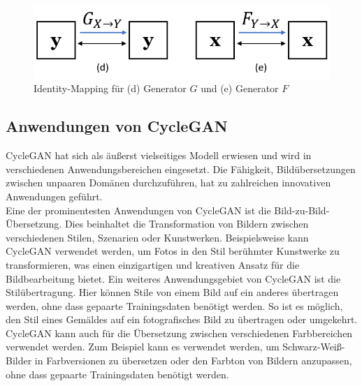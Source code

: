 \begin{figure}[h]
	\centering
	\includegraphics[width=0.7\linewidth]{./images/identity_loss.png}
	\caption{Identity-Mapping für (d) Generator $G$ und (e) Generator $F$}
	\label{fig:IdentityMapping}
\end{figure}


\subsection{Anwendungen von CycleGAN}
CycleGAN hat sich als äußerst vielseitiges Modell erwiesen und wird in verschiedenen Anwendungsbereichen eingesetzt. Die Fähigkeit, Bildübersetzungen zwischen unpaaren Domänen durchzuführen, hat zu zahlreichen innovativen Anwendungen geführt.
\\
Eine der prominentesten Anwendungen von CycleGAN ist die Bild-zu-Bild-Übersetzung. Dies beinhaltet die Transformation von Bildern zwischen verschiedenen Stilen, Szenarien oder Kunstwerken. Beispielsweise kann CycleGAN verwendet werden, um Fotos in den Stil berühmter Kunstwerke zu transformieren, was einen einzigartigen und kreativen Ansatz für die Bildbearbeitung bietet.
Ein weiteres Anwendungsgebiet von CycleGAN ist die Stilübertragung. Hier können Stile von einem Bild auf ein anderes übertragen werden, ohne dass gepaarte Trainingsdaten benötigt werden. So ist es möglich, den Stil eines Gemäldes auf ein fotografisches Bild zu übertragen oder umgekehrt. CycleGAN kann auch für die Übersetzung zwischen verschiedenen Farbbereichen verwendet werden. Zum Beispiel kann es verwendet werden, um Schwarz-Weiß-Bilder in Farbversionen zu übersetzen oder den Farbton von Bildern anzupassen, ohne dass gepaarte Trainingsdaten benötigt werden.
